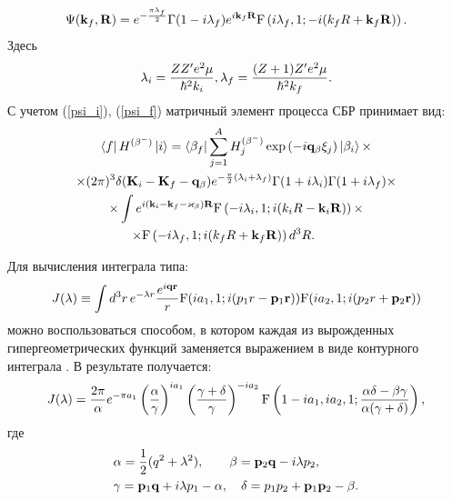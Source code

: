 \documentclass[%
master,    %
natbib,      %
subf,        %
href,        %
colorlinks,  %
]{disser}
\let\vec=\mathbf
\begin{document}
\begin{eqnarray}\label{psi_f}
\Psi (\vec k_f, \vec R)=e^{-{\pi \lambda_f\over2}} \Gamma(1-i\lambda_f)
e^{i \vec k_f \vec R} {\rm F} \left(i \lambda_f,1;-i(k_f R + \vec k_f \vec R)\right).
\end{eqnarray}
Здесь
\begin{eqnarray}
\lambda_i = {Z Z' e^2 \mu\over \hbar^2 k_i},
\lambda_f = {(Z+1) Z' e^2 \mu\over \hbar^2 k_f}.
\end{eqnarray}
С учетом (\ref{psi_i}), (\ref{psi_f}) матричный элемент процесса СБР принимает вид:
\begin{multline}\label{pred_mat}
\bra{f} H^{(\beta^-)}\ket{i}= \bra{\beta_f }
\sum_{j=1}^A H^{(\beta^-)}_{j}\exp{(-i\vec q_\beta\vec\xi_{j})}
\ket{ \beta_i}\times \\
\times(2\pi)^3 \delta (\vec K_i - \vec K_f - \vec q_\beta)
e^{-{\pi\over 2} (\lambda_i + \lambda_f)} \Gamma{(1+i\lambda_i)}
\Gamma{(1+i\lambda_f)}\times\\
\times\int e^{i(\vec k_i - \vec k_f - \vec \varkappa_\beta)\vec R}
{\rm F} \left(-i \lambda_i,1;i(k_i R - \vec k_i \vec R)\right)\times\\
\times{\rm F} \left(-i \lambda_f,1;i(k_f R + \vec k_f \vec R)\right) d^3 R .\qquad
\end{multline}

Для вычисления интеграла типа:
\begin{equation}\label{def_J}
J(\lambda)\equiv\int d^3 r\, e^{-\lambda r} {e^{i\vec q \vec r}\over r}
{\rm F} (i a_1,1;i(p_1 r - \vec p_1 \vec r))
{\rm F} (i a_2,1;i(p_2 r + \vec p_2 \vec r))
\end{equation}
можно воспользоваться способом, в котором каждая из вырожденных гипергеометрических функций
заменяется выражением в виде контурного интеграла \cite{nord, bess}. В результате
получается:
\begin{equation}\label{rez_J}
J(\lambda)={{2\pi}\over\alpha} e^{-\pi a_1}\left({\alpha\over\gamma}\right)^{i a_1}
\left({{\gamma+\delta}\over\gamma}\right)^{-i a_2}{\rm F}\left(1-i a_1, i a_2,
1;{{\alpha\delta-\beta\gamma}\over{\alpha(\gamma+\delta)}}\right),
\end{equation}
где
\begin{equation*}
\begin{split}
&\alpha={1\over2}(q^2+\lambda^2),\qquad \beta=\vec p_2 \vec q - i \lambda p_2,
\\
&\gamma=\vec p_1 \vec q + i \lambda p_1 - \alpha, \quad \delta=p_1 p_2+
\vec p_1 \vec p_2 -\beta.
\end{split}
\end{equation*}
\end{document}
